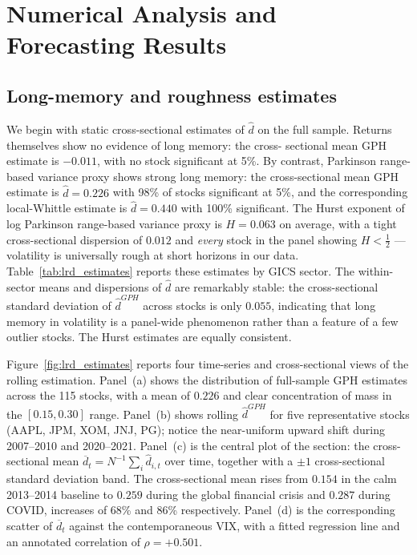 \documentclass[11pt,a4paper]{article}
\newcommand{\dhat}{\hat d}
\begin{document}
\section{Numerical Analysis and Forecasting Results}
\label{sec:results}

\subsection{Long-memory and roughness estimates}

We begin with static cross-sectional estimates of $\dhat$ on the full
sample. Returns themselves show no evidence of long memory: the cross-
sectional mean GPH estimate is $-0.011$, with no stock significant at
5\%. By contrast, Parkinson range-based variance proxy shows strong long memory:
the cross-sectional mean GPH estimate is $\dhat = 0.226$ with 98\% of
stocks significant at 5\%, and the corresponding local-Whittle estimate
is $\dhat = 0.440$ with 100\% significant. The Hurst exponent of log
Parkinson range-based variance proxy is $H = 0.063$ on average, with a tight
cross-sectional dispersion of $0.012$ and \emph{every} stock in the
panel showing $H<\tfrac12$ --- volatility is universally rough at short
horizons in our data. Table~\ref{tab:lrd_estimates} reports these
estimates by GICS sector. The within-sector means and dispersions of
$\dhat$ are remarkably stable: the cross-sectional standard deviation of
$\dhat^{GPH}$ across stocks is only $0.055$, indicating that long memory
in volatility is a panel-wide phenomenon rather than a feature of a few
outlier stocks. The Hurst estimates are equally consistent.



Figure~\ref{fig:lrd_estimates} reports four time-series and
cross-sectional views of the rolling estimation. Panel~(a) shows the
distribution of full-sample GPH estimates across the 115 stocks, with a
mean of $0.226$ and clear concentration of mass in the $[0.15, 0.30]$
range. Panel~(b) shows rolling $\dhat^{GPH}$ for five representative
stocks (AAPL, JPM, XOM, JNJ, PG); notice the near-uniform upward shift
during 2007--2010 and 2020--2021. Panel~(c) is the central plot of the
section: the cross-sectional mean $\overline d_t = N^{-1}\sum_i
\dhat_{i,t}$ over time, together with a $\pm 1$ cross-sectional standard
deviation band. The cross-sectional mean rises from $0.154$ in the
calm 2013--2014 baseline to $0.259$ during the global financial crisis
and $0.287$ during COVID, increases of 68\% and 86\% respectively.
Panel~(d) is the corresponding scatter of $\overline d_t$ against the
contemporaneous VIX, with a fitted regression line and an annotated
correlation of $\rho = +0.501$.
\end{document}
